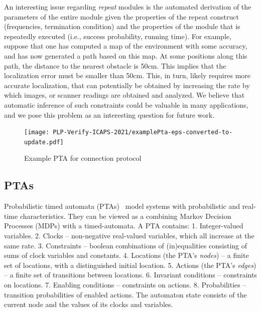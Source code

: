 \documentclass[letterpaper]{article}
\newcommand\note[1]{\todo[inline, color=red!40]{#1}}
\begin{document}
{%
An interesting issue regarding \textit{repeat} modules is the automated derivation of the parameters of the entire module given the properties of the repeat construct (frequencies, termination condition) and the properties of the module that is repeatedly executed (i.e., success probability, running time). For example, suppose that one has computed a map of the environment with some accuracy, and has now generated a path based on this map. At some positions along this
path, the distance to the nearest obstacle is 50cm. This implies that the localization error must be smaller than 50cm.
This, in turn, likely requires more accurate localization, that can potentially be obtained by increasing the rate by which images, or scanner readings are obtained and analyzed. We believe that automatic inference of such constraints could
be valuable in many applications, and we pose this problem as an interesting question for future work.
}


\begin{figure}[t]
\centering
\texttt{[image: PLP-Verify-ICAPS-2021/examplePta-eps-converted-to-update.pdf]}
\caption{Example PTA for connection protocol}
\label{fig:examplePTA}
\end{figure}

\subsection{PTAs}
\par Probabilistic timed automata (PTAs)~\citep{PTA}  model systems with probabilistic and real-time characteristics. They can be viewed
as a combining Markov Decision Processes (MDPs) with a timed-automata.
A PTA contains: 1. Integer-valued variables. 2. Clocks -- non-negative real-valued variables, which all increase at the same rate. 3. Constraints -- boolean combinations of
(in)equalities consisting of sums of clock variables and constants.  4. Locations (the PTA's \textit{nodes}) -- a finite set of locations, with
a distinguished initial location. 5. Actions (the PTA's \textit{edges}) -- a finite set of transitions between locations. 6. Invariant conditions -- constraints on locations. 7. Enabling conditions -- constraints on actions. 8. Probabilities -- transition probabilities of enabled actions. The automaton state consists of the current node and the values of its clocks and variables.
\end{document}

